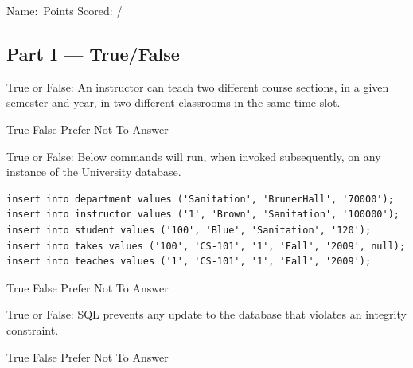 \documentclass[12pt, addpoints, answers]{exam}
\begin{document}
\noindent Name:\ \makebox[3in]{\hrulefill}\hfill Points Scored: \underline{\hspace{3em}} / \numpoints
\begin{questions}

\section*{Part I — True/False}

\begin{minipage}{\linewidth}
\question[3]
True or False: An instructor can teach two different course sections, in a given semester and year, in two different classrooms in the same time slot.\par\vspace{0.5em}
\begin{checkboxes}
    \CorrectChoice True
    \choice False
    \CorrectChoice Prefer Not To Answer
\end{checkboxes}
\end{minipage}\vspace{1em}

\begin{minipage}{\linewidth}
\question[3]
True or False: Below commands will run, when invoked subsequently, on any instance of the University database.\par\vspace{0.5em}
\begin{verbatim}
insert into department values ('Sanitation', 'BrunerHall', '70000');
insert into instructor values ('1', 'Brown', 'Sanitation', '100000');
insert into student values ('100', 'Blue', 'Sanitation', '120');
insert into takes values ('100', 'CS-101', '1', 'Fall', '2009', null);
insert into teaches values ('1', 'CS-101', '1', 'Fall', '2009');
\end{verbatim}
\begin{checkboxes}
    \choice True
    \CorrectChoice False
    \CorrectChoice Prefer Not To Answer
\end{checkboxes}
\end{minipage}\vspace{1em}

\begin{minipage}{\linewidth}
\question[3]
True or False: SQL prevents any update to the database that violates an integrity constraint.\par\vspace{0.5em}
\begin{checkboxes}
    \CorrectChoice True
    \choice False
    \CorrectChoice Prefer Not To Answer
\end{checkboxes}
\end{minipage}\vspace{1em}


\end{questions}
\end{document}
